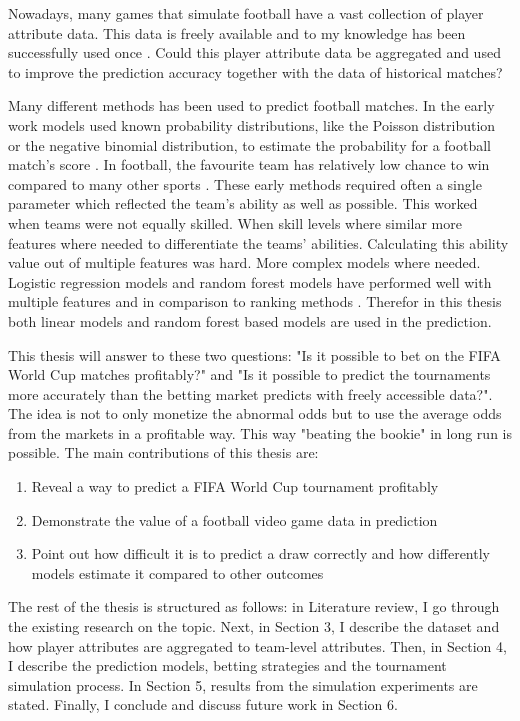 Nowadays,  many games that simulate football have a vast collection of player attribute data. This data is freely available and to my knowledge has been successfully used once \cite{shin2014novel}. Could this player attribute data be aggregated and used to improve the prediction accuracy together with the data of historical matches?

Many different methods has been used to predict football matches. In the early work models used known probability distributions, like the Poisson distribution or the negative binomial distribution, to estimate the probability for a football match's score \cite{moroney1962facts, dixon1997}. In football, the favourite team has relatively low chance to win compared to many other sports \cite{anderson2013numbers}. These early methods required often a single parameter which reflected the team's ability as well as possible. This worked when teams were not equally skilled. When skill levels where similar more features where needed to differentiate the teams' abilities. Calculating this ability value out of multiple features was hard. More complex models where needed. Logistic regression models and random forest models have performed well with multiple features and in comparison to ranking methods \cite{groll2018prediction, 10.1007/978-3-319-29504-6_48}. Therefor in this thesis both linear models and random forest based models are used in the prediction.

This thesis will answer to these two questions: "Is it possible to bet on the FIFA World Cup matches profitably?" and "Is it possible to predict the tournaments more accurately than the betting market predicts with freely accessible data?". The idea is not to only monetize the abnormal odds but to use the average odds from the markets in a profitable way. This way "beating the bookie" in long run is possible. The main contributions of this thesis are:
\begin{enumerate}
    \item Reveal a way to predict a FIFA World Cup tournament profitably
    \item Demonstrate the value of a football video game data in prediction
    \item Point out how difficult it is to predict a draw correctly and how differently models estimate it compared to other outcomes
\end{enumerate}

The rest of the thesis is structured as follows: in Literature review, I go through the existing research on the topic. Next, in Section 3, I describe the dataset and how player attributes are aggregated to team-level attributes. Then, in Section 4, I describe the prediction models, betting strategies and the tournament simulation process. In Section 5, results from the simulation experiments are stated. Finally, I conclude and discuss future work in Section 6.